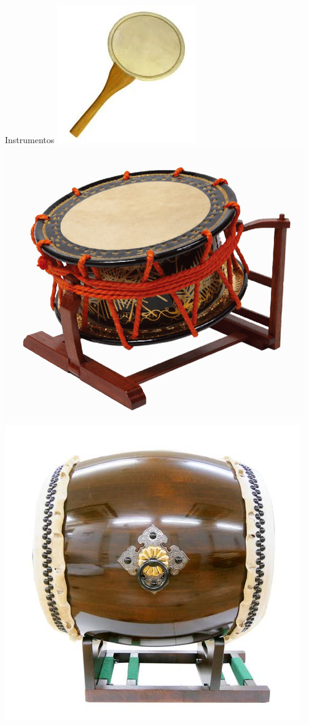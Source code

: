\documentclass{beamer}
\begin{document}
\begin{frame}{Instrumentos}
    \includegraphics[height=0.2\textheight]{instrumentos-13}
    \includegraphics[height=0.2\textheight]{instrumentos-14}
    \includegraphics[height=0.2\textheight]{instrumentos-15}
\end{frame}
\end{document}
